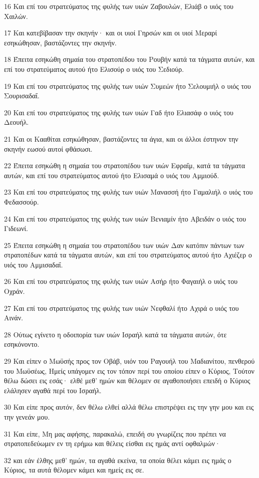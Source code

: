 \par 16 Και επί του στρατεύματος της φυλής των υιών Ζαβουλών, Ελιάβ ο υιός του Χαιλών.
\par 17 Και κατεβίβασαν την σκηνήν· και οι υιοί Γηρσών και οι υιοί Μεραρί εσηκώθησαν, βαστάζοντες την σκηνήν.
\par 18 Έπειτα εσηκώθη σημαία του στρατοπέδου του Ρουβήν κατά τα τάγματα αυτών, και επί του στρατεύματος αυτού ήτο Ελισούρ ο υιός του Σεδιούρ.
\par 19 Και επί του στρατεύματος της φυλής των υιών Συμεών ήτο Σελουμιήλ ο υιός του Σουρισαδαΐ.
\par 20 Και επί του στρατεύματος της φυλής των υιών Γαδ ήτο Ελιασάφ ο υιός του Δεουήλ.
\par 21 Και οι Κααθίται εσηκώθησαν, βαστάζοντες τα άγια, και οι άλλοι έστηνον την σκηνήν εωσού αυτοί φθάσωσι.
\par 22 Έπειτα εσηκώθη η σημαία του στρατοπέδου των υιών Εφραΐμ, κατά τα τάγματα αυτών, και επί του στρατεύματος αυτού ήτο Ελισαμά ο υιός του Αμμιούδ.
\par 23 Και επί του στρατεύματος της φυλής των υιών Μανασσή ήτο Γαμαλιήλ ο υιός του Φεδασσούρ.
\par 24 Και επί του στρατεύματος της φυλής των υιών Βενιαμίν ήτο Αβειδάν ο υιός του Γιδεωνί.
\par 25 Έπειτα εσηκώθη η σημαία του στρατοπέδου των υιών Δαν κατόπιν πάντων των στρατοπέδων κατά τα τάγματα αυτών, και επί του στρατεύματος αυτού ήτο Αχιέζερ ο υιός του Αμμισαδαΐ.
\par 26 Και επί του στρατεύματος της φυλής των υιών Ασήρ ήτο Φαγαιήλ ο υιός του Οχράν.
\par 27 Και επί του στρατεύματος της φυλής των υιών Νεφθαλί ήτο Αχιρά ο υιός του Αινάν.
\par 28 Ούτως εγίνετο η οδοιπορία των υιών Ισραήλ κατά τα τάγματα αυτών, ότε εσηκόνοντο.
\par 29 Και είπεν ο Μωϋσής προς τον Οβάβ, υιόν του Ραγουήλ του Μαδιανίτου, πενθερού του Μωϋσέως, Ημείς υπάγομεν εις τον τόπον περί του οποίου είπεν ο Κύριος, Τούτον θέλω δώσει εις εσάς· ελθέ μεθ' ημών και θέλομεν σε αγαθοποιήσει επειδή ο Κύριος ελάλησεν αγαθά περί του Ισραήλ.
\par 30 Και είπε προς αυτόν, δεν θέλω ελθεί αλλά θέλω επιστρέψει εις την γην μου και εις την γενεάν μου.
\par 31 Και είπε, Μη μας αφήσης, παρακαλώ, επειδή συ γνωρίζεις που πρέπει να στρατοπεδεύωμεν εν τη ερήμω και θέλεις είσθαι εις ημάς αντί οφθαλμών·
\par 32 και εάν έλθης μεθ' ημών, τα αγαθά εκείνα, τα οποία θέλει κάμει εις ημάς ο Κύριος, τα αυτά θέλομεν κάμει και ημείς εις σε.

